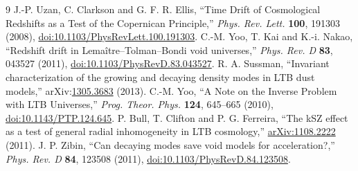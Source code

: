 \documentclass[11pt]{article}
\begin{document}
\begin{thebibliography}{9}
 J.-P. Uzan, C. Clarkson and G. F. R. Ellis, ``Time Drift of Cosmological Redshifts as a Test of the Copernican Principle,'' \emph{Phys. Rev. Lett.} \textbf{100}, 191303 (2008), \href{https://doi.org/10.1103/PhysRevLett.100.191303}{doi:10.1103/PhysRevLett.100.191303}.
 C.-M. Yoo, T. Kai and K.-i. Nakao, ``Redshift drift in Lema\^itre--Tolman--Bondi void universes,'' \emph{Phys. Rev. D} \textbf{83}, 043527 (2011), \href{https://doi.org/10.1103/PhysRevD.83.043527}{doi:10.1103/PhysRevD.83.043527}.
 R. A. Sussman, ``Invariant characterization of the growing and decaying density modes in LTB dust models,'' arXiv:\href{https://arxiv.org/abs/1305.3683}{1305.3683} (2013).
 C.-M. Yoo, ``A Note on the Inverse Problem with LTB Universes,'' \emph{Prog. Theor. Phys.} \textbf{124}, 645--665 (2010), \href{https://doi.org/10.1143/PTP.124.645}{doi:10.1143/PTP.124.645}.
 P. Bull, T. Clifton and P. G. Ferreira, ``The kSZ effect as a test of general radial inhomogeneity in LTB cosmology,'' \href{https://arxiv.org/abs/1108.2222}{arXiv:1108.2222} (2011).
 J. P. Zibin, ``Can decaying modes save void models for acceleration?,'' \emph{Phys. Rev. D} \textbf{84}, 123508 (2011), \href{https://doi.org/10.1103/PhysRevD.84.123508}{doi:10.1103/PhysRevD.84.123508}.
\end{thebibliography}
\end{document}
